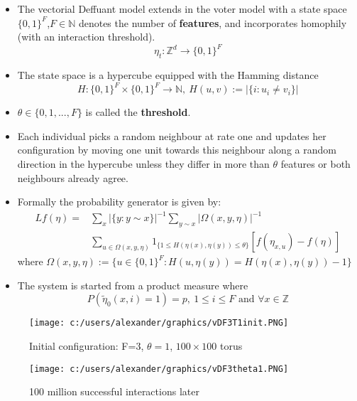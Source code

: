 \documentclass[
paper=128mm:96mm, %
fontsize=11pt, %
pagesize, %
parskip=half-, %
]{scrartcl} %
\theoremstyle{mythmstyle} %
\begin{document}
\begin{itemize}
\item The vectorial Deffuant model extends in the voter model with a state space $\{0,1\}^F$,$F \in \mathbb{N}$ denotes the number of \textbf{features}, and incorporates homophily (with an interaction threshold).
\begin{equation}
\eta_t : \mathbb{Z}^d \longrightarrow \{0,1\}^F
\end{equation}
\item The state space is a hypercube equipped with the Hamming distance 
\begin{equation}
H: \{0,1\}^F\times \{0,1\}^F \rightarrow \mathbb{N}, \: H(u,v):= \vert \{ i: u_{i} \neq v_{i} \} \vert
\end{equation}
\item $\theta \in \{0,1,...,F\}$ is called the \textbf{threshold}.
\item  Each individual picks a random neighbour at rate one and updates
her configuration by moving one unit towards this neighbour along a random direction in the hypercube unless they differ in more than $\theta$ features or both neighbours already agree.
\item Formally the probability generator is given by:
\begin{equation}
\begin{split}
Lf(\eta) = & \sum_{x} {\vert \{y:y \sim x\} \vert}^{-1} \sum_{y \sim x} {\vert \Omega(x,y,\eta) \vert}^{-1} \\ 
& \sum_{u \in \Omega(x,y,\eta)} 1 _{\{ 1 \leq H(\eta(x),\eta(y)) \leq \theta \}} 
[ f(\eta_{x,u})-f(\eta)]
\end{split}
\end{equation}
where $\Omega(x,y,\eta) := \{u \in \{0,1\}^F: H(u,\eta(y)) = H(\eta(x),\eta(y))-1\}$
\item The system is started from a product measure where 
$$ P(\tilde{\eta}_0(x,i)=1)=p, \: 1 \leq i \leq F \text{ and } \forall x\in \mathbb{Z}$$
\end{itemize}

\begin{figure}[!tbp]
  \centering
  \begin{minipage}[b]{0.4\textwidth}
    \texttt{[image: c:/users/alexander/graphics/vDF3T1init.PNG]}
    \caption{Initial configuration: F=3, $\theta=1$, $100\times 100$ torus}
  \end{minipage}
  \hfill
  \begin{minipage}[b]{0.4\textwidth}
    \texttt{[image: c:/users/alexander/graphics/vDF3theta1.PNG]}
    \caption{100 million successful interactions later}
  \end{minipage}
\end{figure}
\end{document}
